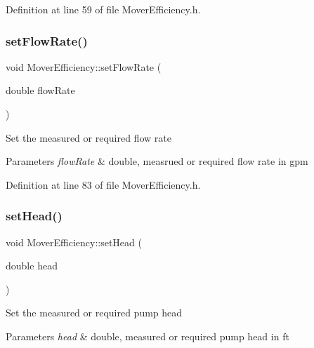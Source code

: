 Definition at line 59 of file Mover\+Efficiency.\+h.

\mbox{\label{class_mover_efficiency_a35bf328fcd7e8334d552bce8b8704379}} 
\subsubsection{\texorpdfstring{set\+Flow\+Rate()}{setFlowRate()}}
{\footnotesize\ttfamily void Mover\+Efficiency\+::set\+Flow\+Rate (\begin{DoxyParamCaption}\item[{double}]{flow\+Rate }\end{DoxyParamCaption})\hspace{0.3cm}{\ttfamily [inline]}}

Set the measured or required flow rate 
\begin{DoxyParams}{Parameters}
{\em flow\+Rate} & double, measrued or required flow rate in gpm \\
\hline
\end{DoxyParams}


Definition at line 83 of file Mover\+Efficiency.\+h.

\mbox{\label{class_mover_efficiency_a1dce269494ecdfc348c8d0a3f9d33df6}} 
\subsubsection{\texorpdfstring{set\+Head()}{setHead()}}
{\footnotesize\ttfamily void Mover\+Efficiency\+::set\+Head (\begin{DoxyParamCaption}\item[{double}]{head }\end{DoxyParamCaption})\hspace{0.3cm}{\ttfamily [inline]}}

Set the measured or required pump head 
\begin{DoxyParams}{Parameters}
{\em head} & double, measured or required pump head in ft \\
\hline
\end{DoxyParams}


